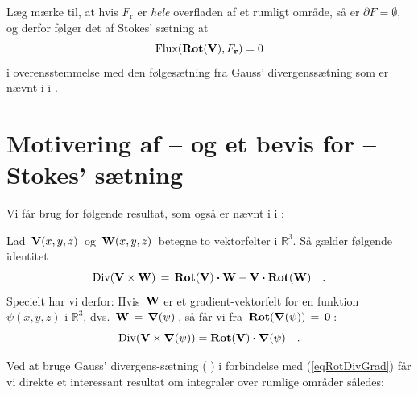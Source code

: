 \begin{aha}
Læg mærke til, at hvis $F_{\mathbf{r}}$ er \emph{hele} overfladen af et rumligt område, så er $\partial F = \emptyset$, og derfor følger det af Stokes' sætning at
\begin{equation}
\operatorname{Flux}(\operatorname{\mathbf{Rot}}(\mathbf{V}), F_{\mathbf{r}}) = 0
\end{equation}
i overensstemmelse med den følgesætning fra Gauss' divergenssætning som er nævnt i  i .
\end{aha}


\section{Motivering af -- og et bevis for --  Stokes' sætning } \label{secBridge}

Vi får brug for følgende resultat, som også er nævnt i  i :

\begin{theorem}\label{exerGaussVgrad}
Lad $\,{\bf{V}}(x,y,z)\,$ og
$\,{\bf{W}}(x,y,z)\,$ betegne to vektorfelter i
$\mathbb{R}^{3}$. Så gælder følgende identitet
\begin{equation}
\operatorname{Div}({\bf{V}}\times {\bf{W}}) \, = \,
\operatorname{\mathbf{Rot}}({\bf{V}})\bm{\cdot} {\bf{W}} - {\bf{V}}\bm{\cdot}
\operatorname{\mathbf{Rot}}({\bf{W}}) \quad .
\end{equation}
Specielt har vi derfor: Hvis  $\,{\bf{W}}$ er et
gradient-vektorfelt for en funktion $\psi(x,y,z)$
i $\mathbb{R}^{3}$, dvs.  $\,{\bf{W}} \, = \,
\bm{\nabla}(\psi)\,$, så får vi fra $\,\operatorname{\mathbf{Rot}} (
\bm{\nabla}(\psi) ) \, = \, {\bf{0}}\,$:
\begin{equation}\label{eqRotDivGrad}
\operatorname{Div}({\bf{V}}\times \bm{\nabla}(\psi)) =
\operatorname{\mathbf{Rot}}({\bf{V}})\bm{\cdot}\bm{\nabla}(\psi) \quad .
\end{equation}
\end{theorem}

Ved at bruge Gauss' divergens-sætning ( ) i forbindelse med (\ref{eqRotDivGrad}) får vi direkte et interessant resultat om
integraler over rumlige områder således:

